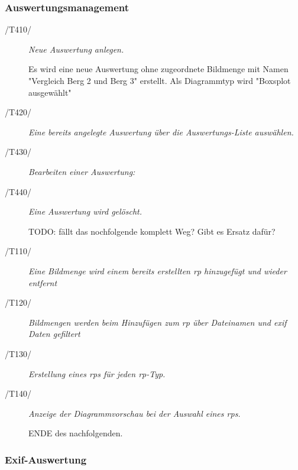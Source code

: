 	\subsubsection{Auswertungsmanagement}

		\begin{description}
		
			\item[/T410/] \textit{Neue Auswertung anlegen.}\par Es wird eine neue Auswertung ohne zugeordnete Bildmenge mit Namen "Vergleich Berg 2 und Berg 3" erstellt. Als Diagrammtyp wird "Boxsplot ausgewählt"
			
			\item[/T420/] \textit{Eine bereits angelegte Auswertung über die Auswertungs-Liste auswählen.}\par
			
			\item[/T430/] \textit{Bearbeiten einer Auswertung:}\par 
				
			\item[/T440/] \textit{Eine Auswertung wird gelöscht.}\par
			
			TODO: fällt das nochfolgende komplett Weg? Gibt es Ersatz dafür?
			\item[/T110/] \textit{Eine Bildmenge wird einem bereits erstellten \gls{rp} hinzugefügt und wieder entfernt}\par
				
			\item[/T120/] \textit{Bildmengen werden beim Hinzufügen zum \gls{rp} über Dateinamen und \gls{exif} Daten gefiltert}\par
				
			\item[/T130/] \textit{Erstellung eines \gls{rp}s für jeden \gls{rp}-Typ.}\par
			
			\item[/T140/] \textit{Anzeige der Diagrammvorschau bei der Auswahl eines \gls{rp}s. }\par
			ENDE des nachfolgenden.
				
		\end{description}
	
	\subsubsection{Exif-Auswertung}
	
